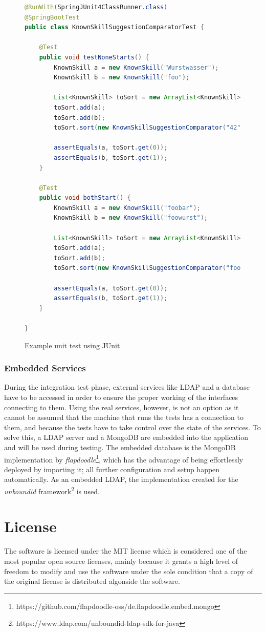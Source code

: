 \begin{figure}[h]
\begin{lstlisting}[language=Java]
@RunWith(SpringJUnit4ClassRunner.class)
@SpringBootTest
public class KnownSkillSuggestionComparatorTest {

	@Test
	public void testNoneStarts() {
		KnownSkill a = new KnownSkill("Wurstwasser");
		KnownSkill b = new KnownSkill("foo");

		List<KnownSkill> toSort = new ArrayList<KnownSkill>();
		toSort.add(a);
		toSort.add(b);
		toSort.sort(new KnownSkillSuggestionComparator("42"));

		assertEquals(a, toSort.get(0));
		assertEquals(b, toSort.get(1));
	}

	@Test
	public void bothStart() {
		KnownSkill a = new KnownSkill("foobar");
		KnownSkill b = new KnownSkill("foowurst");

		List<KnownSkill> toSort = new ArrayList<KnownSkill>();
		toSort.add(a);
		toSort.add(b);
		toSort.sort(new KnownSkillSuggestionComparator("foo"));

		assertEquals(a, toSort.get(0));
		assertEquals(b, toSort.get(1));
	}

}
\end{lstlisting}
\caption[Example Unit Test]{Example unit test using JUnit}
\end{figure}


\subsubsection{Embedded Services}
During the integration test phase, external services like LDAP and a database have to be accessed in order to ensure the proper working of the interfaces connecting to them. Using the real services, however, is not an option as it cannot be assumed that the machine that runs the tests has a connection to them, and because the tests have to take control over the state of the services. To solve this, a LDAP server and a MongoDB are embedded into the application and will be used during testing.
The embedded database is the MongoDB implementation by \textit{flapdoodle}\footnote{https://github.com/flapdoodle-oss/de.flapdoodle.embed.mongo}, which has the advantage of being effortlessly deployed by importing it; all further configuration and setup happen automatically. As an embedded LDAP, the implementation created for the \textit{unboundid} framework\footnote{https://www.ldap.com/unboundid-ldap-sdk-for-java} is used.

\section{License}
The software is licensed under the MIT license \cite{license} which is considered one of the most popular open source licenses, mainly because it grants a high level of freedom to modify and use the software under the sole condition that a copy of the original license is distributed algonside the software.

